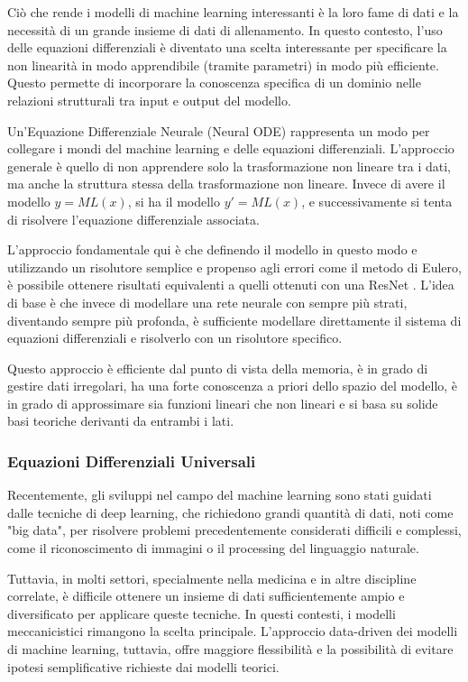 Ciò che rende i modelli di machine learning interessanti è la loro fame 
di dati e la necessità di un grande insieme di dati di allenamento. 
In questo contesto, l'uso delle equazioni differenziali è diventato 
una scelta interessante per specificare la non linearità in modo 
apprendibile (tramite parametri) in modo più efficiente. Questo permette 
di incorporare la conoscenza specifica di un dominio nelle relazioni 
strutturali tra input e output del modello.

Un'Equazione Differenziale Neurale (Neural ODE) rappresenta un modo per 
collegare i mondi del machine learning e delle equazioni differenziali. 
L'approccio generale è quello di non apprendere solo la trasformazione 
non lineare tra i dati, ma anche la struttura stessa della 
trasformazione non lineare. Invece di avere il modello $y = ML(x)$, 
si ha il modello $y' = ML(x)$, e successivamente si tenta di risolvere 
l'equazione differenziale associata.

L'approccio fondamentale qui è che definendo il modello in questo modo e 
utilizzando un risolutore semplice e propenso agli errori come il metodo 
di Eulero, è possibile ottenere risultati equivalenti a quelli ottenuti 
con una ResNet \cite{he2015deep}. L'idea di base è che invece di 
modellare una rete neurale con sempre più strati, diventando sempre 
più profonda, è sufficiente modellare direttamente il sistema di 
equazioni differenziali e risolverlo con un risolutore specifico.

Questo approccio è efficiente dal punto di vista della memoria, è in 
grado di gestire dati irregolari, ha una forte conoscenza a priori 
dello spazio del modello, è in grado di approssimare sia funzioni 
lineari che non lineari e si basa su solide basi teoriche derivanti da 
entrambi i lati.

\subsubsection{Equazioni Differenziali Universali}

Recentemente, gli sviluppi nel campo del machine learning sono stati 
guidati dalle tecniche di deep learning, che richiedono grandi quantità 
di dati, noti come "big data", per risolvere problemi precedentemente 
considerati difficili e complessi, come il riconoscimento di immagini o 
il processing del linguaggio naturale.

Tuttavia, in molti settori, specialmente nella medicina e in altre 
discipline correlate, è difficile ottenere un insieme di dati 
sufficientemente ampio e diversificato per applicare queste tecniche. 
In questi contesti, i modelli meccanicistici rimangono la scelta 
principale. L'approccio data-driven dei modelli di machine learning, 
tuttavia, offre maggiore flessibilità e la possibilità di evitare 
ipotesi semplificative richieste dai modelli teorici.

